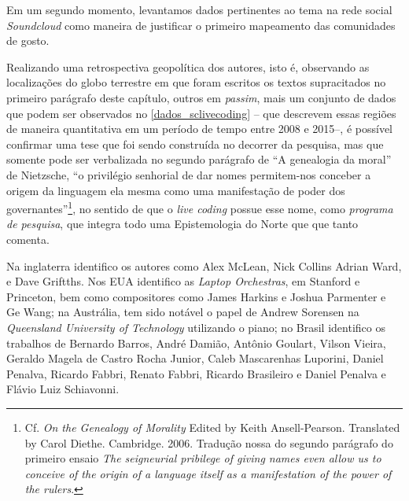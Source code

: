 Em um segundo momento, levantamos dados pertinentes ao tema na rede social \emph{Soundcloud} como maneira de justificar o primeiro mapeamento das comunidades de gosto.

Realizando uma retrospectiva geopolítica dos autores, isto é, observando as localizações do globo terrestre em que foram escritos os textos supracitados no primeiro parágrafo deste capítulo, outros em \emph{passim}, mais um conjunto de dados que podem ser observados no \autoref{dados_sclivecoding} -- que descrevem essas regiões de maneira quantitativa em um período de tempo entre 2008 e 2015--, é possível confirmar uma tese que foi sendo construída no decorrer da pesquisa, mas que somente pode ser verbalizada no segundo parágrafo de ``A genealogia da moral'' de Nietzsche, ``o privilégio senhorial de dar nomes permitem-nos conceber a origem da linguagem ela mesma como uma manifestação de poder dos governantes''\footnote{Cf. \emph{On the Genealogy of Morality} Edited by Keith Ansell-Pearson. Translated by Carol Diethe. Cambridge. 2006. Tradução nossa do segundo parágrafo do primeiro ensaio \emph{The seigneurial pribilege of giving names even allow us to conceive of the origin of a language itself as a manifestation of the power of the rulers}.}, no sentido de que o \emph{live coding} possue esse nome, como \emph{programa de pesquisa}, que integra todo uma Epistemologia do Norte que que  tanto comenta.

Na inglaterra identifico os autores como Alex McLean, Nick Collins Adrian Ward, e Dave Griftths. Nos EUA identifico as \emph{Laptop Orchestras}, em Stanford e Princeton, bem como compositores como James Harkins e Joshua Parmenter e Ge Wang;  na Austrália, tem sido notável o papel de Andrew Sorensen na \emph{Queensland University of Technology} utilizando o piano; no Brasil identifico os trabalhos de Bernardo Barros, André Damião, Antônio Goulart, Vilson Vieira, Geraldo Magela de Castro Rocha Junior, Caleb Mascarenhas Luporini, Daniel Penalva, Ricardo Fabbri, Renato Fabbri, Ricardo Brasileiro e Daniel Penalva e Flávio Luiz Schiavonni. 

